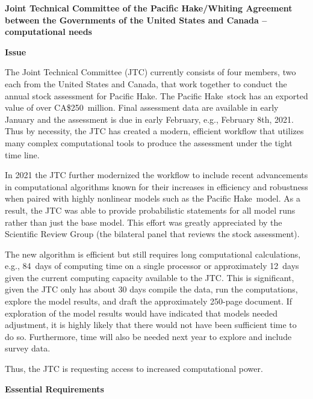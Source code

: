 \documentclass[12pt]{book}\usepackage[]{graphicx}\usepackage[]{color}
\newcommand{\fishname}{Pacific Hake}
\begin{document}
\begin{center}
  {\bf \Large Joint Technical Committee of the \fishname/Whiting Agreement between
    the Governments of the United States and Canada -- computational needs}
\end{center}

{\bf Issue}

The Joint Technical Committee (JTC) currently consists of four members, two each
from the United States and Canada, that work together to conduct the annual stock assessment
for \fishname. The \fishname\ stock has an exported value of over
CA\$250~million.
Final assessment data are available in early
January and the assessment is due in early February, e.g., February 8th, 2021.
Thus by necessity, the JTC has created a modern, efficient workflow that utilizes many complex
computational tools to produce the assessment under the tight time line.

In 2021 the JTC further modernized the workflow to include recent advancements in computational algorithms
known for their increases in efficiency and robustness when paired with
highly nonlinear models such as the \fishname\ model.
As a result, the JTC was able to provide probabilistic statements
for all model runs rather than just the base model.
This effort was greatly appreciated by the
Scientific Review Group (the bilateral panel that reviews the stock
assessment).

The new algorithm is efficient but still requires long computational calculations,
e.g., 84~days of computing time on a single processor or approximately
12~days given the current computing capacity available to the JTC.
This is significant, given the JTC only has about 30 days
compile the data, run the computations,
explore the model results, and
draft the approximately 250-page document.
If exploration of the model results would have
indicated that models needed adjustment, it is highly likely that there would
not have been sufficient time to do so. Furthermore, time will also be needed next
year to explore and include survey data.

Thus, the JTC is requesting access to increased computational power.

{\bf Essential Requirements}
\end{document}
